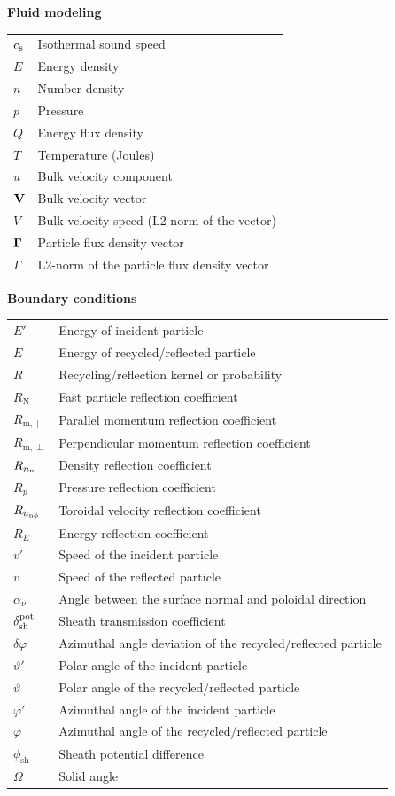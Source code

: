 	
\textbf{Fluid modeling} \\
\begin{tabular}{L{2cm} L{8cm}}
	$c_{\mathrm{s}}$ &  Isothermal sound speed \\
	$E$ &  Energy density \\
	$n$ &  Number density \\
	$p$ &  Pressure \\
	$Q$ &  Energy flux density \\
	$T$ &  Temperature (Joules) \\
	$u$ &  Bulk velocity component \\
	${\bf V}$ &  Bulk velocity vector \\
	$V$ &   Bulk velocity speed (L2-norm of the vector) \\
	${\bf \Gamma}$ &  Particle flux density vector \\
	$\Gamma$ &   L2-norm of the particle flux density vector \\
\end{tabular}

\newpage 
\textbf{Boundary conditions} \\
\begin{tabular}{L{2cm} L{12cm}}
	$E'$ &  Energy of incident particle \\
	$E$ &  Energy of recycled/reflected particle \\
	$R$ &  Recycling/reflection kernel or probability \\
	$R_{\mathrm{N}}$ &  Fast particle reflection coefficient \\
	$R_{\mathrm{m},||}$ &  Parallel momentum reflection coefficient \\
	$R_{\mathrm{m},\perp}$ &  Perpendicular momentum reflection coefficient \\
	$R_{n_{\mathrm{n}}}$ &  Density reflection coefficient \\
	$R_{p}$ &  Pressure reflection coefficient \\
	$R_{u_{\mathrm{n}\phi}}$ &  Toroidal velocity reflection coefficient \\
	$R_{E}$ & Energy reflection coefficient \\
	$v'$ & Speed of the incident particle \\
	$v$ & Speed of the reflected particle \\
	$\alpha_{\nu}$ & Angle between the surface normal and poloidal direction \\
	$\delta_{\mathrm{sh}}^{\mathrm{pot}}$ & Sheath transmission coefficient \\
	$\delta \varphi$ & Azimuthal angle deviation of the recycled/reflected particle \\
	$\vartheta'$ & Polar angle of the incident particle \\
	$\vartheta$ & Polar angle of the recycled/reflected particle \\
	$\varphi'$ & Azimuthal angle of the incident particle \\
	$\varphi$ & Azimuthal angle of the recycled/reflected particle \\
	$\phi_{\mathrm{sh}}$ & Sheath potential difference \\
	$\Omega$ & Solid angle
\end{tabular}

